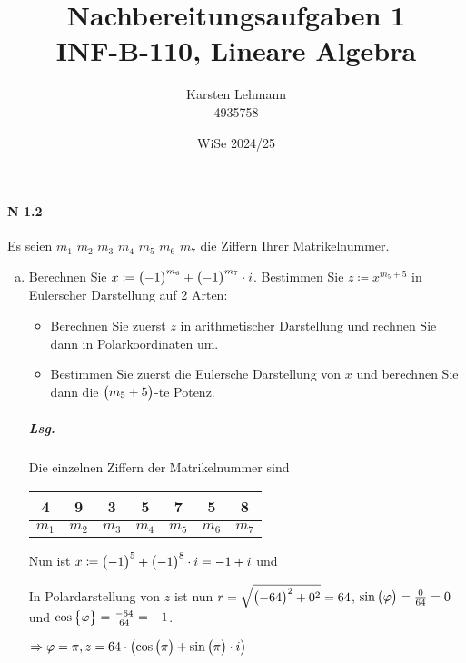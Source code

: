 \documentclass{scrreprt}
\author{Karsten Lehmann \\ 4935758}
\date{WiSe 2024/25}
\title{Nachbereitungsaufgaben 1\\INF-B-110, Lineare Algebra}
\begin{document}
\paragraph{N 1.2} Es seien $m_1$ $m_2$ $m_3$ $m_4$ $m_5$ $m_6$ $m_7$ die Ziffern
Ihrer Matrikelnummer.

\begin{enumerate}[(a)]
\item Berechnen Sie $x \coloneqq \qty\big(-1)^{m_6} + \qty\big(-1)^{m_7} \cdot i$.
  Bestimmen Sie $z \coloneqq x^{m_5 + 5}$ in Eulerscher Darstellung auf 2 Arten:
  \begin{itemize}
  \item Berechnen Sie zuerst $z$ in arithmetischer Darstellung und rechnen Sie
    dann in Polarkoordinaten um.
  \item Bestimmen Sie zuerst die Eulersche Darstellung von $x$ und berechnen Sie dann
    die $\qty\big(m_5 + 5)$-te Potenz.
  \end{itemize}

  \subparagraph{Lsg.} Die einzelnen Ziffern der Matrikelnummer sind

  \begin{tabular}{|c|c|c|c|c|c|c|}
    \hline
    4 & 9 & 3 & 5 & 7 & 5 & 8 \\
    \hline
    $m_1$ & $m_2$ & $m_3$ & $m_4$ & $m_5$ & $m_6$ & $m_7$ \\
    \hline
  \end{tabular}

  Nun ist $x \coloneqq \qty\big(-1)^5 + \qty\big(-1)^8 \cdot i = -1 + i$ und

  In Polardarstellung von $z$ ist nun $r = \sqrt{\qty\big(-64)^2 + 0^2} = 64$,
  $\sin\qty\big(\varphi) = \frac{0}{64} = 0$ und
  $\cos\qty\big{\varphi} = \frac{-64}{64} = -1$.

  $\Rightarrow \varphi = \pi, z = 64 \cdot \qty(\cos\qty\big(\pi) + \sin\qty\big(\pi) \cdot i)$


\end{enumerate}
\end{document}

